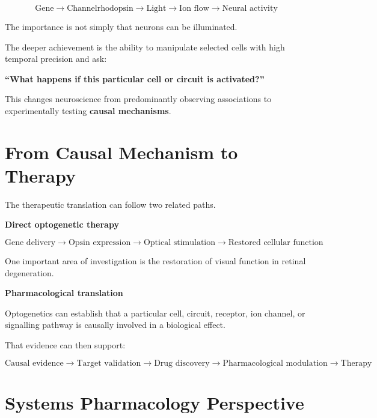 \documentclass[11pt]{article}
\begin{document}
\begin{center}
\[
\boxed{
\text{Gene}
\rightarrow
\text{Channelrhodopsin}
\rightarrow
\text{Light}
\rightarrow
\text{Ion flow}
\rightarrow
\text{Neural activity}
}
\]
\end{center}

The importance is not simply that neurons can be illuminated.

The deeper achievement is the ability to manipulate selected
cells with high temporal precision and ask:

\begin{center}
{\color{SlatePurple}\Large\bfseries
``What happens if this particular cell or circuit is activated?''}
\end{center}

This changes neuroscience from predominantly observing
associations to experimentally testing \textbf{causal mechanisms}.

\section{From Causal Mechanism to Therapy}

The therapeutic translation can follow two related paths.

\begin{therapybox}
\textbf{\color{Maroon}Direct optogenetic therapy}

\[
\text{Gene delivery}
\rightarrow
\text{Opsin expression}
\rightarrow
\text{Optical stimulation}
\rightarrow
\text{Restored cellular function}
\]

One important area of investigation is the restoration of
visual function in retinal degeneration.
\end{therapybox}

\begin{conceptbox}
\textbf{\color{SteelBlue}Pharmacological translation}

Optogenetics can establish that a particular cell, circuit,
receptor, ion channel, or signalling pathway is causally involved
in a biological effect.

That evidence can then support:

\[
\boxed{
\text{Causal evidence}
\rightarrow
\text{Target validation}
\rightarrow
\text{Drug discovery}
\rightarrow
\text{Pharmacological modulation}
\rightarrow
\text{Therapy}
}
\]
\end{conceptbox}

\section{Systems Pharmacology Perspective}
\end{document}
